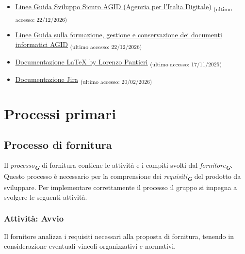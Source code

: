 \documentclass[a4paper,12pt]{article}
\newcommand{\glossario}[1]{\textit{#1}\textsubscript{\textbf{\textit{\textcolor{lightblack}{G}}}}}
\newcommand{\ped}[1]{\textsubscript{#1}}
\begin{document}
\begin{itemize}
\begin{itemize}
              \item \href{https://www.math.unipd.it/~tullio/IS-1/2025/Dispense/T10.pdf}{\ul{https://www.math.unipd.it/~tullio/IS-1/2025/Dispense/T10.pdf}} \ped{(ultimo accesso: 17/02/2025)}
              \item \href{https://www.math.unipd.it/~tullio/IS-1/2025/Dispense/T11.pdf}{\ul{https://www.math.unipd.it/~tullio/IS-1/2025/Dispense/T11.pdf}} \ped{(ultimo accesso: 17/02/2025)}
          \end{itemize}
    \item \href{https://www.agid.gov.it/it/sicurezza/cert-pa/linee-guida-sviluppo-del-software-sicuro}{\ul{Linee Guida Sviluppo Sicuro AGID (Agenzia per l'Italia Digitale)}} \ped{(ultimo accesso: 22/12/2026)}
    \item  \href{https://www.agid.gov.it/it/linee-guida#index-3}{\ul{Linee Guida sulla formazione, gestione e conservazione dei documenti informatici AGID}} \ped{(ultimo accesso: 22/12/2026)}
    \item \href{https://www.lorenzopantieri.net/LaTeX_files/LaTeXpedia.pdf}{\ul{Documentazione \LaTeX{} by Lorenzo Pantieri}} \ped{(ultimo accesso: 17/11/2025)}
    \item \href{https://confluence.atlassian.com/jira}{\ul{Documentazione Jira}} \ped{(ultimo accesso: 20/02/2026)}
\end{itemize}

\section{Processi primari}

\subsection{Processo di fornitura}\label{processoDiFornitura}
Il \glossario{processo} di fornitura contiene le attività e i compiti svolti
dal \glossario{fornitore}. Questo processo è necessario per la comprensione dei
\glossario{requisiti} del prodotto da sviluppare. Per implementare
correttamente il processo il gruppo si impegna a svolgere le seguenti attività.

\subsubsection{Attività: Avvio}
Il fornitore analizza i requisiti necessari alla proposta di fornitura, tenendo
in considerazione eventuali vincoli organizzativi e normativi.
\end{document}
